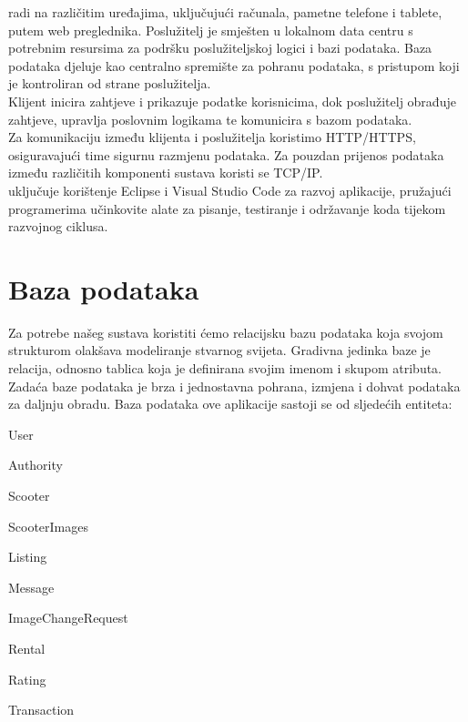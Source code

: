 		\indent \textit{} radi na različitim uređajima, uključujući računala, pametne telefone i tablete, putem web preglednika. Poslužitelj je smješten u lokalnom data centru s potrebnim resursima za podršku poslužiteljskoj logici i bazi podataka. Baza podataka djeluje kao centralno spremište za pohranu podataka, s pristupom koji je kontroliran od strane poslužitelja. \\
		
		\indent Klijent inicira zahtjeve i prikazuje podatke korisnicima, dok poslužitelj obrađuje zahtjeve, upravlja poslovnim logikama te komunicira s bazom podataka. \\
		\indent Za komunikaciju između klijenta i poslužitelja koristimo HTTP/HTTPS, osiguravajući time sigurnu razmjenu podataka. Za pouzdan prijenos podataka između različitih komponenti sustava koristi se TCP/IP. \\
		
		\indent \textit{} uključuje korištenje Eclipse i Visual Studio Code za razvoj aplikacije, pružajući programerima učinkovite alate za pisanje, testiranje i održavanje koda tijekom razvojnog ciklusa. \\
				
		\section{Baza podataka}
			
			\noindent Za potrebe našeg sustava koristiti ćemo relacijsku bazu podataka koja svojom strukturom olakšava modeliranje stvarnog svijeta. Gradivna jedinka baze je relacija, odnosno tablica koja je definirana svojim imenom i skupom atributa. Zadaća baze podataka je brza i jednostavna pohrana, izmjena i dohvat podataka za daljnju obradu.
			Baza podataka ove aplikacije sastoji se od sljedećih entiteta:
			
			\begin{packed_item} 
				\item User
				\item Authority
				\item Scooter
				\item ScooterImages
				\item Listing
				\item Message
				\item ImageChangeRequest
				\item Rental
				\item Rating
				\item Transaction
			\end{packed_item}
				
